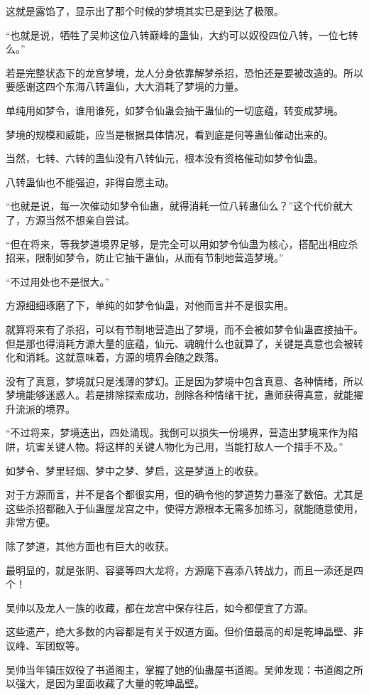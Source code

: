 \begin{this_body}
这就是露馅了，显示出了那个时候的梦境其实已是到达了极限。

“也就是说，牺牲了吴帅这位八转巅峰的蛊仙，大约可以奴役四位八转，一位七转么。”

若是完整状态下的龙宫梦境，龙人分身依靠解梦杀招，恐怕还是要被改造的。所以要感谢这四个东海八转蛊仙，大大消耗了梦境的力量。

单纯用如梦令，谁用谁死，如梦令仙蛊会抽干蛊仙的一切底蕴，转变成梦境。

梦境的规模和威能，应当是根据具体情况，看到底是何等蛊仙催动出来的。

当然，七转、六转的蛊仙没有八转仙元，根本没有资格催动如梦令仙蛊。

八转蛊仙也不能强迫，非得自愿主动。

“也就是说，每一次催动如梦令仙蛊，就得消耗一位八转蛊仙么？”这个代价就大了，方源当然不想亲自尝试。

“但在将来，等我梦道境界足够，是完全可以用如梦令仙蛊为核心，搭配出相应杀招来，限制如梦令，防止它抽干蛊仙，从而有节制地营造梦境。”

“不过用处也不是很大。”

方源细细琢磨了下，单纯的如梦令仙蛊，对他而言并不是很实用。

就算将来有了杀招，可以有节制地营造出了梦境，而不会被如梦令仙蛊直接抽干。但是那也得消耗方源大量的底蕴，仙元、魂魄什么也就算了，关键是真意也会被转化和消耗。这就意味着，方源的境界会随之跌落。

没有了真意，梦境就只是浅薄的梦幻。正是因为梦境中包含真意、各种情绪，所以梦境能够迷惑人。若是排除探索成功，剖除各种情绪干扰，蛊师获得真意，就能擢升流派的境界。

“不过将来，梦境迭出，四处涌现。我倒可以损失一份境界，营造出梦境来作为陷阱，坑害关键人物。将这样的关键人物化为己用，当能打敌人一个措手不及。”

如梦令、梦里轻烟、梦中之梦、梦启，这是梦道上的收获。

对于方源而言，并不是各个都很实用，但的确令他的梦道势力暴涨了数倍。尤其是这些杀招都融入于仙蛊屋龙宫之中，使得方源根本无需多加练习，就能随意使用，非常方便。

除了梦道，其他方面也有巨大的收获。

最明显的，就是张阴、容婆等四大龙将，方源麾下喜添八转战力，而且一添还是四个！

吴帅以及龙人一族的收藏，都在龙宫中保存往后，如今都便宜了方源。

这些遗产，绝大多数的内容都是有关于奴道方面。但价值最高的却是乾坤晶壁、非议峰、军团蚁等。

吴帅当年镇压奴役了书道阁主，掌握了她的仙蛊屋书道阁。吴帅发现：书道阁之所以强大，是因为里面收藏了大量的乾坤晶壁。


\end{this_body}
